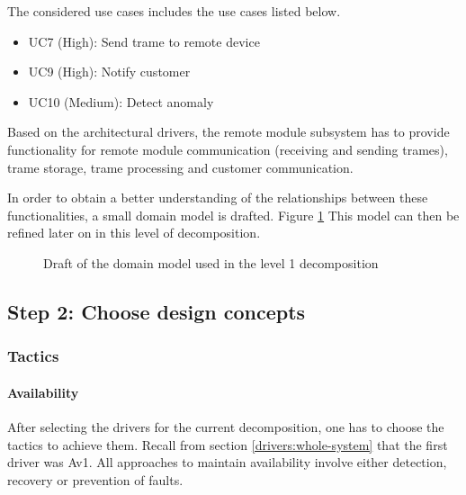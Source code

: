 \npar The considered use cases includes the use cases listed below. 

\begin{itemize}
	\item UC7 (High): Send trame to remote device
	\item UC9 (High): Notify customer
	\item UC10 (Medium): Detect anomaly
\end{itemize}

\npar Based on the architectural drivers, the remote module subsystem has to
provide functionality for remote module communication (receiving and sending
trames), trame storage, trame processing and customer communication. 

\npar In order to obtain a better understanding of the relationships between
these functionalities, a small domain model is drafted. Figure
\ref{fig:dec/whole-system/draft} This model can then be refined later on
in this level of decomposition.

\begin{figure}[H]
	\begin{centering}
		\caption{Draft of the domain model used in the level 1 decomposition}
		\label{fig:dec/whole-system/draft}
	\end{centering}
\end{figure}

\subsection{Step 2: Choose design concepts}
\label{add:it1/concepts}

\subsubsection{Tactics}
\label{add:it1/tactics}

\paragraph{Availability}

\npar After selecting the drivers for the current decomposition, one has to
choose the tactics to achieve them. Recall from section
\ref{drivers:whole-system} that the first driver was Av1. All approaches to
maintain availability involve either detection, recovery or prevention of
faults.

